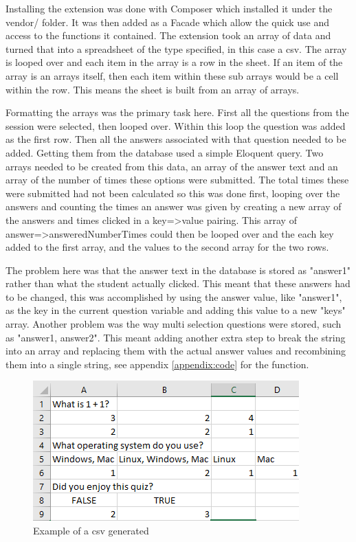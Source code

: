 Installing the extension was done with Composer which installed it under the vendor/ folder. It was then added as a Facade\cite{laravel-facades} which allow the quick use and access to the functions it contained. The extension took an array of data and turned that into a spreadsheet of the type specified, in this case a csv. The array is looped over and each item in the array is a row in the sheet. If an item of the array is an arrays itself, then each item within these sub arrays would be a cell within the row. This means the sheet is built from an array of arrays. 

Formatting the arrays was the primary task here. First all the questions from the session were selected, then looped over. Within this loop the question was added as the first row. Then all the answers associated with that question needed to be added. Getting them from the database used a simple Eloquent query. Two arrays needed to be created from this data, an array of the answer text and an array of the number of times these options were submitted. The total times these were submitted had not been calculated so this was done first, looping over the answers and counting the times an answer was given by creating a new array of the answers and times clicked in a key=>value pairing. This array of answer=>answeredNumberTimes could then be looped over and the each key added to the first array, and the values to the second array for the two rows.

The problem here was that the answer text in the database is stored as "answer1" rather than what the student actually clicked. This meant that these answers had to be changed, this was accomplished by using the answer value, like "answer1", as the key in the current question variable and adding this value to a new "keys" array. Another problem was the way multi selection questions were stored, such as "answer1, answer2". This meant adding another extra step to break the string into an array and replacing them with the actual answer values and recombining them into a single string, see appendix \ref{appendix:code} for the function.
\begin{figure}
	\caption{Example of a csv generated}
	\centerline{\includegraphics{Chapter2/Iter-10/csv-example}}
	\label{fig:csv-example}
\end{figure}

